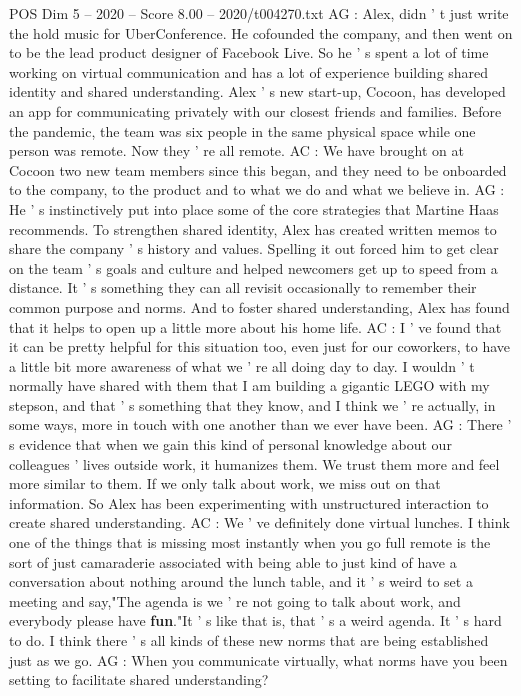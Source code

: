 \begin{textsample}{POS Dim 5 – 2020 – Score 8.00 – 2020/t004270.txt}
AG : Alex, didn ' t just write the hold music for UberConference.
He cofounded the company, and then went on to be the lead product designer of Facebook Live.
So he ' s spent a lot of time working on virtual communication and has a lot of experience building shared identity and shared understanding.
Alex ' s new start-up, Cocoon, has developed an app for communicating privately with our closest friends and families.
Before the pandemic, the team was six people in the same physical space while one person was remote.
Now they ' re all remote.
AC : We have brought on at Cocoon two new team members since this began, and they need to be onboarded to the company, to the product and to what we do and what we believe in.
AG : He ' s instinctively put into place some of the core strategies that Martine Haas recommends.
To strengthen shared identity, Alex has created written memos to share the company ' s history and values.
Spelling it out forced him to get clear on the team ' s goals and culture and helped newcomers get up to speed from a distance.
It ' s something they can all revisit occasionally to remember their common purpose and norms.
And to foster shared understanding, Alex has found that it helps to open up a little more about his home life.
AC : I ' ve found that it can be pretty helpful for this situation too, even just for our coworkers, to have a little bit more awareness of what we ' re all doing day to day.
I wouldn ' t normally have shared with them that I am building a gigantic LEGO with my stepson, and that ' s something that they know, and I think we ' re actually, in some ways, more in touch with one another than we ever have been.
AG : There ' s evidence that when we gain this kind of personal knowledge about our colleagues ' lives outside work, it humanizes them.
We trust them more and feel more similar to them.
If we only talk about work, we miss out on that information.
So Alex has been experimenting with unstructured interaction to create shared understanding.
AC : We ' ve definitely done virtual lunches.
I think one of the things that is missing most instantly when you go full remote is the sort of just camaraderie associated with being able to just kind of have a conversation about nothing around the lunch table, and it ' s weird to set a meeting and say,"The agenda is we ' re not going to talk about work, and everybody please have \textbf{fun}."It ' s like that is, that ' s a weird agenda.
It ' s hard to do.
I think there ' s all kinds of these new norms that are being established just as we go.
AG : When you communicate virtually, what norms have you been setting to facilitate shared understanding?

\end{textsample}
